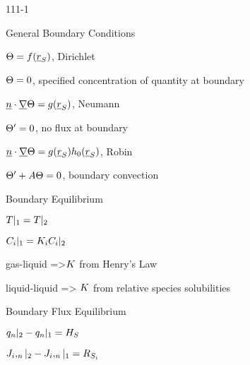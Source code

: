 \begin{mitframe}{111-1}
 \begin{listone}
	\item General Boundary Conditions
    	\begin{listtwo}
        \item $\dimltemp=\fug(\uline{\pos}_{\entropy})$, Dirichlet
             	\begin{listthree}
            	\item $\dimltemp=0$, specified concentration of quantity at boundary
        	\end{listthree}
          	\item $\uline{n}\cdot\gradop\dimltemp=\grav(\uline{\pos}_{\entropy})$, Neumann
            \begin{listthree}
            	\item $\dimltemp'=0$, no flux at boundary
             \end{listthree}   
             \item $\uline{n}\cdot\gradop\dimltemp=\grav(\uline{\pos}_{\entropy})\heattranscoeff_{\init}(\uline{\pos}_{\entropy})$, Robin
               \begin{listthree}
               		\item $\dimltemp'+\helmholtz\dimltemp=0$, boundary convection
               \end{listthree}
          \end{listtwo}
	\item Boundary Equilibrium
    		\begin{listtwo}
            	\item $\Temp|_1=\Temp|_2$
                \item $\conc_{\state}|_1=\dilfac_{\state}\conc_{\state}|_2$
                \begin{listthree}
                	\item gas-liquid =>$\dilfac$ from Henry's Law
                    \item liquid-liquid => $\dilfac$ from relative species solubilities
                \end{listthree}         
            \end{listtwo}
	\item Boundary Flux Equilibrium
    		\begin{listtwo}
            	\item $\heatflux_n|_2-\heatflux_n|_1=\enthalpy_{\entropy}$
                \item $\molspecflux,_n|_2-\molspecflux,_n|_1=\gasconst_{\entropy_{\state}}$

\end{listtwo}
\end{listone}
\end{mitframe}
